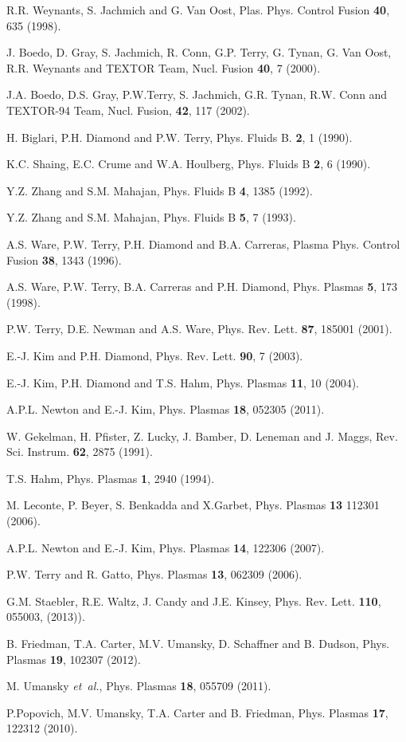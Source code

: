 \documentclass[aip,pop,amsmath,amssymb,preprint,superscriptaddress]{revtex4-1} %
\begin{document}
\begin{thebibliography}{10}
R.R. Weynants, S. Jachmich and G. Van Oost, Plas. Phys. Control Fusion {\bf 40}, 635 (1998).

J. Boedo, D. Gray, S. Jachmich, R. Conn, G.P. Terry, G. Tynan, G. Van Oost, R.R. Weynants and TEXTOR Team, Nucl. Fusion {\bf 40},  7  (2000).

J.A. Boedo, D.S. Gray, P.W.Terry, S. Jachmich, G.R. Tynan, R.W. Conn and TEXTOR-94 Team, Nucl. Fusion, {\bf 42}, 117 (2002).

H. Biglari, P.H. Diamond and P.W. Terry, Phys. Fluids B. {\bf 2},  1  (1990).

K.C. Shaing, E.C. Crume and W.A. Houlberg, Phys. Fluids B {\bf 2}, 6 (1990).

Y.Z. Zhang and S.M. Mahajan, Phys. Fluids B {\bf 4}, 1385 (1992).

Y.Z. Zhang and S.M. Mahajan, Phys. Fluids B {\bf 5}, 7 (1993).

A.S. Ware, P.W. Terry, P.H. Diamond and B.A. Carreras, Plasma Phys. Control Fusion {\bf 38},  1343  (1996).

A.S. Ware, P.W. Terry, B.A. Carreras and P.H. Diamond, Phys. Plasmas {\bf 5}, 173 (1998).

P.W. Terry, D.E. Newman and A.S. Ware, Phys. Rev. Lett. {\bf 87}, 185001  (2001).

E.-J. Kim and P.H. Diamond, Phys. Rev. Lett. {\bf 90}, 7 (2003).

E.-J. Kim, P.H. Diamond and T.S. Hahm, Phys. Plasmas {\bf 11},  10  (2004).

A.P.L. Newton and E.-J. Kim, Phys. Plasmas {\bf 18}, 052305 (2011).

W. Gekelman, H. Pfister, Z. Lucky, J. Bamber, D. Leneman and J. Maggs, Rev. Sci. Instrum. {\bf 62},  2875  (1991).

T.S. Hahm, Phys. Plasmas {\bf 1}, 2940 (1994).

M. Leconte, P. Beyer, S. Benkadda and X.Garbet, Phys. Plasmas {\bf 13} 112301 (2006).

A.P.L. Newton and E.-J. Kim, Phys. Plasmas {\bf 14}, 122306 (2007).

P.W. Terry and R. Gatto, Phys. Plasmas {\bf 13}, 062309 (2006).

G.M. Staebler, R.E. Waltz, J. Candy and J.E. Kinsey, Phys. Rev. Lett. {\bf 110}, 055003, (2013)).

B. Friedman, T.A. Carter, M.V. Umansky, D. Schaffner and B. Dudson, Phys. Plasmas {\bf 19}, 102307 (2012).

M. Umansky {\it et~al.}, Phys. Plasmas {\bf 18},  055709  (2011).

P.Popovich, M.V. Umansky, T.A. Carter and B. Friedman, Phys. Plasmas {\bf 17}, 122312 (2010).

\end{thebibliography}
\end{document}
